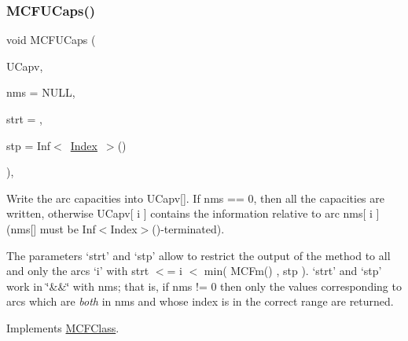 \mbox{\label{class_m_c_f_cplex_aa5d64c820aa5952a8cd80d4a89eb334a}} 
\subsubsection{\texorpdfstring{M\+C\+F\+U\+Caps()}{MCFUCaps()}}
{\footnotesize\ttfamily void M\+C\+F\+U\+Caps (\begin{DoxyParamCaption}\item[{\mbox{\hyperlink{class_m_c_f_class_a9dae1f1a39c208ce3c2b337cd5bb3d00}{F\+Row}}}]{U\+Capv,  }\item[{\mbox{\hyperlink{class_m_c_f_class_a81575b2d4e4d5636b17170432150ae69}{c\+Index\+\_\+\+Set}}}]{nms = {\ttfamily NULL},  }\item[{\mbox{\hyperlink{class_m_c_f_class_a76aaabb20535c51a2752b93f6c38fe54}{c\+Index}}}]{strt = {},  }\item[{\mbox{\hyperlink{class_m_c_f_class_ad53d6229d7ec28555a9c9c2fd9abf773}{Index}}}]{stp = {\ttfamily Inf$<$~\mbox{\hyperlink{class_m_c_f_class_ad53d6229d7ec28555a9c9c2fd9abf773}{Index}}~$>$()} }\end{DoxyParamCaption})\hspace{0.3cm}{\ttfamily [override]}, {\ttfamily [virtual]}}

Write the arc capacities into U\+Capv\mbox{[}\mbox{]}. If nms == 0, then all the capacities are written, otherwise U\+Capv\mbox{[} i \mbox{]} contains the information relative to arc nms\mbox{[} i \mbox{]} (nms\mbox{[}\mbox{]} must be Inf$<$\+Index$>$()-\/terminated).

The parameters `strt' and `stp' allow to restrict the output of the method to all and only the arcs `i' with strt $<$= i $<$ min( M\+C\+Fm() , stp ). `strt' and `stp' work in \char`\"{}\&\&\char`\"{} with nms; that is, if nms != 0 then only the values corresponding to arcs which are {\itshape both} in nms and whose index is in the correct range are returned. 

Implements \mbox{\hyperlink{class_m_c_f_class_a999b9738aa5cb925c5b4a799ed6d4838}{M\+C\+F\+Class}}.

\mbox{\label{class_m_c_f_cplex_af8adf5d3a1f9dfb9c2dd30c170663136}} 
